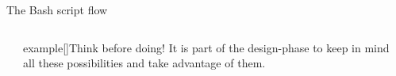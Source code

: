 \begin{frame}{The Bash script flow}
\begin{columns}[c]
\begin{column}{0.08\textwidth}
        \end{column}
        \begin{column}{0.4\textwidth}
            \begin{varblock}{example}[\textwidth]{Think before doing!}
                It is part of the design-phase to keep in mind all these possibilities and take advantage of them.
            \end{varblock}
        \end{column}
        \begin{column}{0.52\textwidth}
        \end{column}
    \end{columns}
\end{frame}
